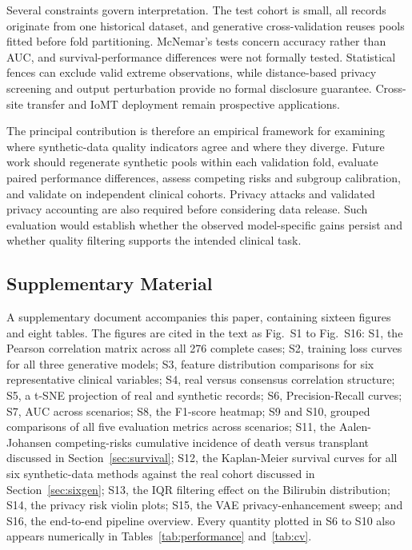 \documentclass[journal]{IEEEtran}
\begin{document}
Several constraints govern interpretation. The test cohort is small, all records originate from one historical dataset, and generative cross-validation reuses pools fitted before fold partitioning. McNemar's tests concern accuracy rather than AUC, and survival-performance differences were not formally tested. Statistical fences can exclude valid extreme observations, while distance-based privacy screening and output perturbation provide no formal disclosure guarantee. Cross-site transfer and IoMT deployment remain prospective applications.

The principal contribution is therefore an empirical framework for examining where synthetic-data quality indicators agree and where they diverge. Future work should regenerate synthetic pools within each validation fold, evaluate paired performance differences, assess competing risks and subgroup calibration, and validate on independent clinical cohorts. Privacy attacks and validated privacy accounting are also required before considering data release. Such evaluation would establish whether the observed model-specific gains persist and whether quality filtering supports the intended clinical task.

\subsection*{Supplementary Material}
A supplementary document accompanies this paper, containing sixteen figures and eight tables. The figures are cited in the text as Fig.~S1 to Fig.~S16: S1, the Pearson correlation matrix across all 276 complete cases; S2, training loss curves for all three generative models; S3, feature distribution comparisons for six representative clinical variables; S4, real versus consensus correlation structure; S5, a t-SNE projection of real and synthetic records; S6, Precision-Recall curves; S7, AUC across scenarios; S8, the F1-score heatmap; S9 and S10, grouped comparisons of all five evaluation metrics across scenarios; S11, the Aalen-Johansen competing-risks cumulative incidence of death versus transplant discussed in Section~\ref{sec:survival}; S12, the Kaplan-Meier survival curves for all six synthetic-data methods against the real cohort discussed in Section~\ref{sec:sixgen}; S13, the IQR filtering effect on the Bilirubin distribution; S14, the privacy risk violin plots; S15, the VAE privacy-enhancement sweep; and S16, the end-to-end pipeline overview. Every quantity plotted in S6 to S10 also appears numerically in Tables~\ref{tab:performance} and~\ref{tab:cv}.
\end{document}
